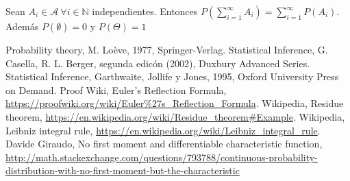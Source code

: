\documentclass{article}
\begin{document}
    \begin{lem}
        Sean $A_i \in \mathcal{A} \ \forall i \in \mathbb{N}$ independientes. Entonces $P(\sum\limits_{i = 1}^{\infty}A_i) = \sum\limits_{i = 1}^{\infty}P(A_i)$. Además $P(\emptyset) = 0 $ y $P(\Theta) = 1$
    \end{lem}

\pagebreak
\begin{thebibliography}{99}
 Probability theory, M. Loève, 1977, Springer-Verlag.
 Statistical Inference, G. Casella, R. L. Berger, segunda edicón (2002), Duxbury Advanced Series.
 Statistical Inference, Garthwaite, Jollife y Jones, 1995, Oxford University Press on Demand.
 Proof Wiki, Euler's Reflection Formula, \url{https://proofwiki.org/wiki/Euler%27s_Reflection_Formula}.
 Wikipedia, Residue theorem, \url{https://en.wikipedia.org/wiki/Residue_theorem#Example}.
 Wikipedia, Leibniz integral rule, \url{https://en.wikipedia.org/wiki/Leibniz_integral_rule}.
 Davide Giraudo, No first moment and differentiable characteristic function, \url{http://math.stackexchange.com/questions/793788/continuous-probability-distribution-with-no-first-moment-but-the-characteristic}
\end{thebibliography}
\end{document}
